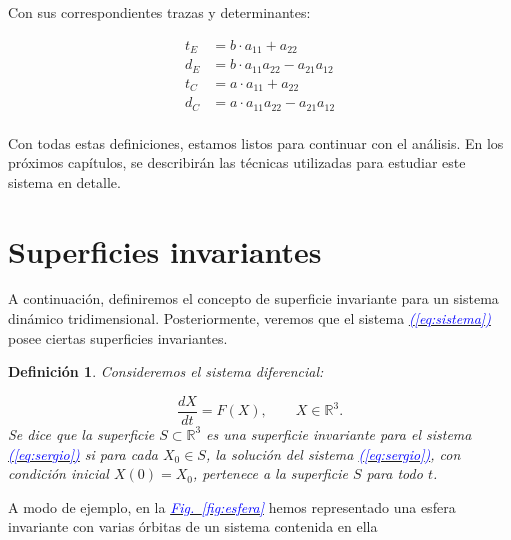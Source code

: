 \documentclass[12pt,a4paper]{report} %
\newtheorem{definicion}{Definición}[chapter] %
\newcommand{\fref}[1]{\hyperref[#1]{\textcolor{blue}{\textit{Fig.~\ref*{#1}}}}}
\newcommand{\eref}[1]{\hyperref[#1]{\textcolor{blue}{\textit{(\ref*{#1})}}}}
\begin{document}
    \noindent Con sus correspondientes trazas y determinantes:
    
    \begin{equation}
    \begin{aligned}
    	t_E &= b \cdot a_{11} + a_{22}\\
    	d_E &= b \cdot a_{11}a_{22} - a_{21}a_{12}\\
    	t_C &= a \cdot a_{11} + a_{22}\\
    	d_C &= a \cdot a_{11}a_{22} - a_{21}a_{12}\\
    \end{aligned}
    \end{equation}\smallskip
    
	\noindent Con todas estas definiciones, estamos listos para continuar con el análisis. En los próximos capítulos, se describirán las técnicas utilizadas para estudiar este sistema en detalle.
	
	\newpage
	
	\section{Superficies invariantes}
	\label{sec:2.4}
	
	\noindent A continuación, definiremos el concepto de superficie invariante para un sistema dinámico tridimensional. Posteriormente, veremos que el sistema \eref{eq:sistema} posee ciertas superficies invariantes.
	
	\begin{definicion}
		Consideremos el sistema diferencial:
		
		\begin{equation}
			\label{eq:sergio}
			\frac{dX}{dt}=F(X),\qquad X\in \mathbb{R}^3.
		\end{equation}\smallskip
		Se dice que la superficie $S\subset \mathbb{R}^3$ es una superficie invariante para el sistema \eref{eq:sergio} si para cada $X_0 \in S$, la solución del sistema \eref{eq:sergio}, con condición inicial $X(0)=X_0$, pertenece a la superficie $S$ para todo $t$.
	\end{definicion}\smallskip
	
	\vspace{0.5cm}A modo de ejemplo, en la \fref{fig:esfera} hemos representado una esfera invariante con varias órbitas de un sistema contenida en ella
	
\end{document}
